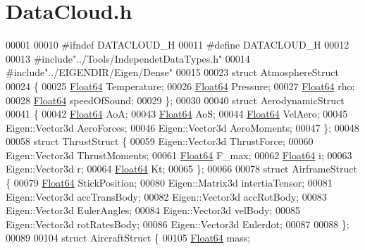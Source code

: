 \hypertarget{_data_cloud_8h_source}{}\section{Data\+Cloud.\+h}
\label{_data_cloud_8h_source}

\begin{DoxyCode}
00001 
00010 \textcolor{preprocessor}{#ifndef DATACLOUD\_H}
00011 \textcolor{preprocessor}{#define DATACLOUD\_H}
00012 
00013 \textcolor{preprocessor}{#include"../Tools/IndependetDataTypes.h"}
00014 \textcolor{preprocessor}{#include"../EIGENDIR/Eigen/Dense"}
00015 
00023 \textcolor{keyword}{struct }AtmosphereStruct
00024 \{
00025     \hyperlink{group___tools_ga3f1431cb9f76da10f59246d1d743dc2c}{Float64}  Temperature;    
00026     \hyperlink{group___tools_ga3f1431cb9f76da10f59246d1d743dc2c}{Float64} Pressure;       
00027     \hyperlink{group___tools_ga3f1431cb9f76da10f59246d1d743dc2c}{Float64}  rho;            
00028     \hyperlink{group___tools_ga3f1431cb9f76da10f59246d1d743dc2c}{Float64} speedOfSound;   
00029 \};
00030 
00040 \textcolor{keyword}{struct }AerodynamicStruct
00041 \{
00042     \hyperlink{group___tools_ga3f1431cb9f76da10f59246d1d743dc2c}{Float64} AoA;     
00043     \hyperlink{group___tools_ga3f1431cb9f76da10f59246d1d743dc2c}{Float64} AoS;
00044     \hyperlink{group___tools_ga3f1431cb9f76da10f59246d1d743dc2c}{Float64} VelAero; 
00045     Eigen::Vector3d AeroForces;
00046     Eigen::Vector3d AeroMoments;
00047 \};
00048 
00058 \textcolor{keyword}{struct }ThrustStruct \{
00059     Eigen::Vector3d ThrustForce;    
00060     Eigen::Vector3d ThrustMoments;  
00061     \hyperlink{group___tools_ga3f1431cb9f76da10f59246d1d743dc2c}{Float64}  F\_max;                  
00062     \hyperlink{group___tools_ga3f1431cb9f76da10f59246d1d743dc2c}{Float64}  i;                      
00063     Eigen::Vector3d r;
00064     \hyperlink{group___tools_ga3f1431cb9f76da10f59246d1d743dc2c}{Float64}  Kt;                     
00065 \};
00066 
00078 \textcolor{keyword}{struct }AirframeStruct \{
00079     \hyperlink{group___tools_ga3f1431cb9f76da10f59246d1d743dc2c}{Float64} StickPosition;   
00080     Eigen::Matrix3d intertiaTensor;
00081     Eigen::Vector3d accTransBody;
00082     Eigen::Vector3d accRotBody;
00083     Eigen::Vector3d EulerAngles;
00084     Eigen::Vector3d velBody;
00085     Eigen::Vector3d rotRatesBody;
00086     Eigen::Vector3d Eulerdot;
00087 
00088 \};
00089 
00104 \textcolor{keyword}{struct }AircraftStruct \{
00105     \hyperlink{group___tools_ga3f1431cb9f76da10f59246d1d743dc2c}{Float64}  mass;

\end{DoxyCode}
